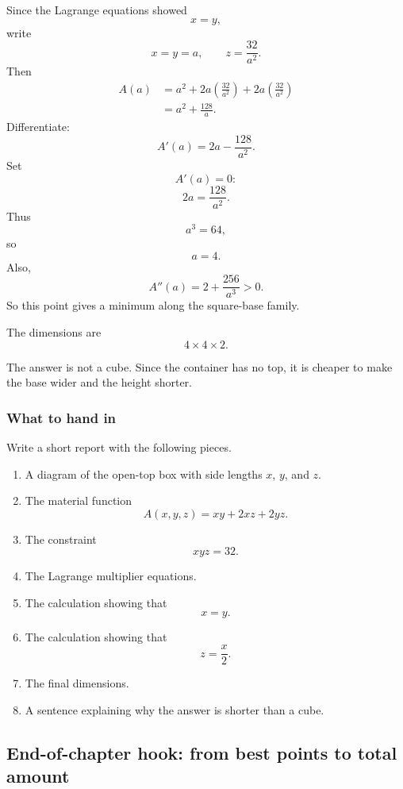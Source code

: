 Since the Lagrange equations showed
\[
    x=y,
\]
write
\[
    x=y=a,
    \qquad
    z=\frac{32}{a^2}.
\]
Then
\[
\begin{aligned}
    A(a)
    &=
    a^2+2a\left(\frac{32}{a^2}\right)
        +2a\left(\frac{32}{a^2}\right)\\
    &=
    a^2+\frac{128}{a}.
\end{aligned}
\]
Differentiate:
\[
    A'(a)=2a-\frac{128}{a^2}.
\]
Set
\[
    A'(a)=0:
\]
\[
    2a=\frac{128}{a^2}.
\]
Thus
\[
    a^3=64,
\]
so
\[
    a=4.
\]
Also,
\[
    A''(a)=2+\frac{256}{a^3}>0.
\]
So this point gives a minimum along the square-base family.

The dimensions are
\[
\boxed{
    4\times4\times2.
}
\]

The answer is not a cube.  Since the container has no top, it is cheaper to make the
base wider and the height shorter.

\subsubsection*{What to hand in}

Write a short report with the following pieces.

\begin{enumerate}
\item A diagram of the open-top box with side lengths \(x\), \(y\), and \(z\).

\item The material function
\[
    A(x,y,z)=xy+2xz+2yz.
\]

\item The constraint
\[
    xyz=32.
\]

\item The Lagrange multiplier equations.

\item The calculation showing that
\[
    x=y.
\]

\item The calculation showing that
\[
    z=\frac{x}{2}.
\]

\item The final dimensions.

\item A sentence explaining why the answer is shorter than a cube.
\end{enumerate}

\subsection{End-of-chapter hook: from best points to total amount}

